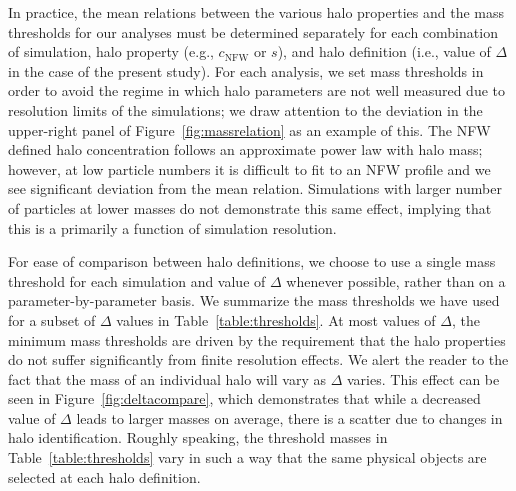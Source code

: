 \documentclass[usenatbib,fleqn]{mnras}
\begin{document}
In practice, the mean relations between the various halo properties and the mass 
thresholds for our analyses must be determined separately for each combination of simulation, halo property (e.g., $c_{\mathrm{NFW}}$ or $s$), and halo definition (i.e., value of $\Delta$ in the case of the present study). For each analysis, we set mass thresholds in order to avoid the regime in which halo parameters are not well measured due to resolution limits of the simulations; we draw attention to the deviation in the upper-right panel of Figure~\ref{fig:massrelation} as an example of this. The NFW defined halo concentration follows an approximate power law with halo mass; however, at low particle numbers it is difficult to fit to an NFW profile and we see significant deviation from the mean relation. Simulations with larger number of particles at lower masses do not demonstrate this same effect, implying that this is a primarily a function of simulation resolution.

For ease of comparison between halo definitions, we choose to use a single mass threshold for each simulation and value of $\Delta$ whenever possible, rather than on a parameter-by-parameter basis. We summarize the mass thresholds we have used for a 
subset of $\Delta$ values in Table~\ref{table:thresholds}. 
At most values of $\Delta$, the minimum mass thresholds are 
driven by the requirement that the halo properties do 
not suffer significantly from finite resolution effects. We alert the reader to the fact that the mass of an individual halo will vary as $\Delta$ varies. This effect can be seen in Figure~\ref{fig:deltacompare}, which demonstrates that while a decreased value of $\Delta$ leads to larger masses on average, there is a scatter due to changes in halo identification. Roughly speaking, the threshold masses in Table~\ref{table:thresholds} vary in such a way that the 
same physical objects are selected at each halo definition.

\end{document}
